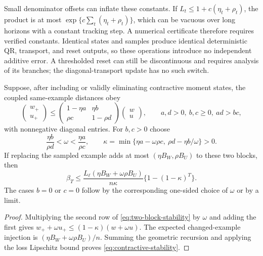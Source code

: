 Small denominator offsets can inflate these constants. If
$L_t\le1+c(\eta_t+\rho_t)$, the product is at most
$\exp\{c\sum_t(\eta_t+\rho_t)\}$, which can be vacuous over long
horizons with a constant tracking step. A numerical certificate therefore
requires verified constants. Identical states and samples produce
identical deterministic QR, transport, and reset outputs, so these
operations introduce no independent additive error. A thresholded reset
can still be discontinuous and requires analysis of its branches; the
diagonal-transport update has no such switch.

\begin{proposition}
\label{prop:small-gain}
Suppose, after including or validly eliminating contractive moment states,
the coupled same-example distances obey
\begin{equation}
 \begin{pmatrix}w_+\\u_+\end{pmatrix}
 \le\begin{pmatrix}1-\eta a&\eta b\\\rho c&1-\rho d\end{pmatrix}
       \begin{pmatrix}w\\u\end{pmatrix},\qquad
 a,d>0,\ b,c\ge0,\ ad>bc,\label{eq:two-block-stability}
\end{equation}
with nonnegative diagonal entries. For $b,c>0$ choose
\begin{equation}
 \frac{\eta b}{\rho d}<\omega<\frac{\eta a}{\rho c},\qquad
 \kappa=\min\{\eta a-\omega\rho c,\ \rho d-\eta b/\omega\}>0.
\end{equation}
If replacing the sampled example adds at most $(\eta B_W,\rho B_U)$
to these two blocks, then
\begin{equation}
 \beta_T\le\frac{L_\ell(\eta B_W+\omega\rho B_U)}{n\kappa}
                \{1-(1-\kappa)^T\}.\label{eq:contractive-stability}
\end{equation}
The cases $b=0$ or $c=0$ follow by the corresponding one-sided choice
of $\omega$ or by a limit.
\end{proposition}
\begin{proof}
Multiplying the second row of \eqref{eq:two-block-stability} by $\omega$
and adding the first gives
$w_++\omega u_+\le(1-\kappa)(w+\omega u)$.
The expected changed-example injection is
$(\eta B_W+\omega\rho B_U)/n$.
Summing the geometric recursion and applying the loss Lipschitz bound
proves \eqref{eq:contractive-stability}.
\end{proof}


